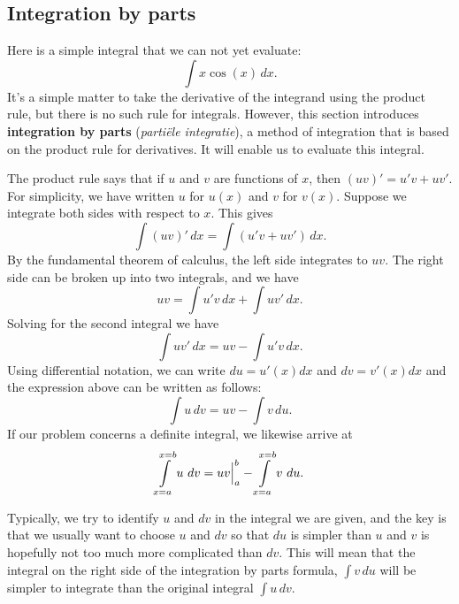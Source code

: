 \fi



\subsection{Integration by parts}\label{sec:IBP}
\ifcourse
	\checkoddpage
{}
\fi

Here is a simple integral that we can not yet evaluate:
$$\int x\cos(x) \,dx.$$
It's a simple matter to take the derivative of the integrand using the product rule, but there is no such rule for integrals.  However, this section introduces \textbf{integration by parts} (\textit{parti\"ele integratie}), a method of integration that is based on the product rule for derivatives. It will enable us to evaluate this integral.

The product rule says that if $u$ and $v$ are functions of $x$, then  $(uv)' = u'v + uv'$.  For simplicity, we have written $u$ for $u(x)$ and $v$ for $v(x)$.  Suppose we integrate both sides with respect to $x$.  This gives
$$\int (uv)'\,dx = \int (u'v+uv')\,dx.$$
By the fundamental theorem of calculus, the left side integrates to $uv$.  The right side can be broken up into two integrals, and we have
$$uv = \int u'v\,dx + \int uv'\,dx.$$
Solving for the second integral we have 
$$\int uv'\,dx = uv - \int u'v\,dx.$$
Using differential notation, we can write $du = u'(x)dx$ and $dv=v'(x)dx$ and the expression above can be written as follows:
\begin{equation}
\int u\,dv = uv - \int v\,du.
\label{thm:IBP}
\end{equation}
If our problem concerns a definite integral, we likewise arrive at 
$$\displaystyle\int\limits_{x=a}^{x=b} u\ dv = uv\Big|_a^b - \displaystyle\int\limits_{x=a}^{x=b}v\ du.$$

Typically, we try to identify $u$ and $dv$ in the integral we are given, and the key is that we usually want to choose $u$ and $dv$ so that $du$ is simpler than $u$ and $v$ is hopefully not too much more complicated than $dv$.  This will mean that the integral on the right side of the integration by parts formula, $\int v\,du$ will be simpler to integrate than the original integral $\int u\,dv$.

